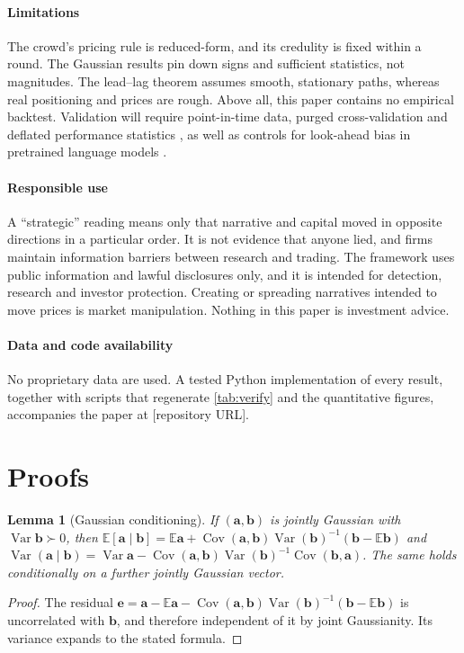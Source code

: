 \documentclass[11pt,a4paper]{article}
\theoremstyle{sci}
\newtheorem{lemma}[theorem]{Lemma}
\theoremstyle{scidef}
\newcommand{\E}{\mathbb{E}}
\DeclareMathOperator{\Var}{Var}
\DeclareMathOperator{\Cov}{Cov}
\begin{document}
\paragraph{Limitations} The crowd's pricing rule is reduced-form, and its credulity is fixed within a round. The Gaussian results pin down signs and sufficient statistics, not magnitudes. The lead--lag theorem assumes smooth, stationary paths, whereas real positioning and prices are rough. Above all, this paper contains no empirical backtest. Validation will require point-in-time data, purged cross-validation and deflated performance statistics \citep{lopezdeprado2018,bailey2014dsr}, as well as controls for look-ahead bias in pretrained language models \citep{glasserman2023}.

\paragraph{Responsible use} A ``strategic'' reading means only that narrative and capital moved in opposite directions in a particular order. It is not evidence that anyone lied, and firms maintain information barriers between research and trading. The framework uses public information and lawful disclosures only, and it is intended for detection, research and investor protection. Creating or spreading narratives intended to move prices is market manipulation. Nothing in this paper is investment advice.

\paragraph{Data and code availability} No proprietary data are used. A tested Python implementation of every result, together with scripts that regenerate \cref{tab:verify} and the quantitative figures, accompanies the paper at [repository URL].


{\small}

\clearpage
\appendix
\section{Proofs}\label{app:proofs}

\begin{lemma}[Gaussian conditioning]\label{lem:gauss}
If $(\bm a,\bm b)$ is jointly Gaussian with $\Var\bm b\succ0$, then $\E[\bm a\mid\bm b]=\E\bm a+\Cov(\bm a,\bm b)\Var(\bm b)^{-1}(\bm b-\E\bm b)$ and $\Var(\bm a\mid\bm b)=\Var\bm a-\Cov(\bm a,\bm b)\Var(\bm b)^{-1}\Cov(\bm b,\bm a)$. The same holds conditionally on a further jointly Gaussian vector.
\end{lemma}
\begin{proof}
The residual $\bm e=\bm a-\E\bm a-\Cov(\bm a,\bm b)\Var(\bm b)^{-1}(\bm b-\E\bm b)$ is uncorrelated with $\bm b$, and therefore independent of it by joint Gaussianity. Its variance expands to the stated formula.
\end{proof}
\end{document}
